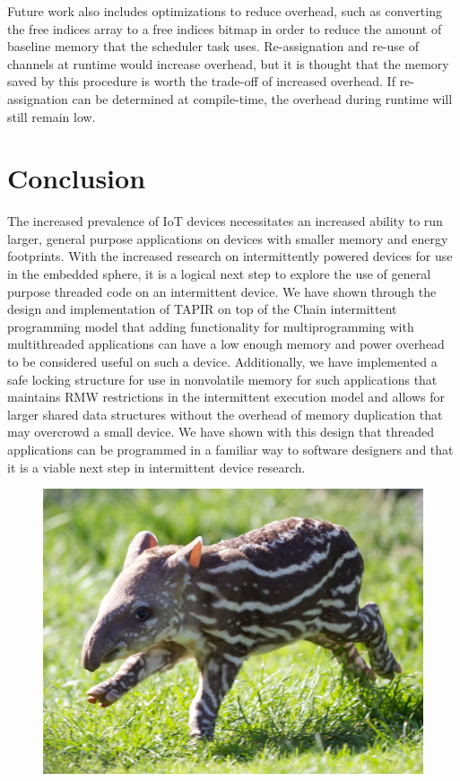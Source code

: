 \documentclass[11pt]{sensys-proc}
\begin{document}
Future work also includes optimizations to reduce overhead, such as converting
the free indices array to a free indices bitmap in order to reduce the amount of
baseline memory that the scheduler task uses.  Re-assignation and re-use of
channels at runtime would increase overhead, but it is thought that the memory
saved by this procedure is worth the trade-off of increased overhead.  If
re-assignation can be determined at compile-time, the overhead during runtime
will still remain low.

\section{Conclusion}
The increased prevalence of IoT devices necessitates an increased ability to
run larger, general purpose applications on devices with smaller memory and
energy footprints. With the increased research on intermittently powered devices
for use in the embedded sphere, it is a logical next step to explore the use
of general purpose threaded code on an intermittent device. We have shown
through the design and implementation of TAPIR on top of the Chain intermittent
programming model that adding functionality for multiprogramming with
multithreaded applications can have a low enough memory and power overhead to be
considered useful on such a device. Additionally, we have implemented a safe
locking structure for use in nonvolatile memory for such applications that
maintains RMW restrictions in the intermittent execution model and allows
for larger shared data structures without the overhead of memory duplication
that may overcrowd a small device. We have shown with this design that threaded
applications can be programmed in a familiar way to software designers and that
it is a viable next step in intermittent device research.

\begin{figure}[hb]
  \centering
  \includegraphics[width=0.9\columnwidth]{figs/tapir}
\end{figure}


\balance

\end{document}
